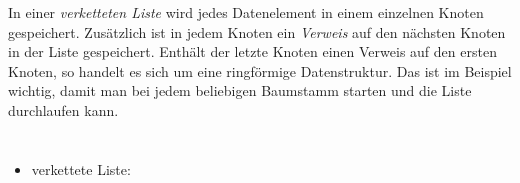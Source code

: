 {{In einer \emph{verketteten Liste} wird jedes Datenelement in einem einzelnen Knoten gespeichert. Zusätzlich ist in jedem Knoten ein \emph{Verweis} auf den nächsten Knoten in der Liste gespeichert. Enthält der letzte Knoten einen Verweis auf den ersten Knoten, so handelt es sich um eine ringförmige Datenstruktur. Das ist im Beispiel wichtig, damit man bei jedem beliebigen Baumstamm starten und die Liste durchlaufen kann.



\section*{\BrochureWebsitesAndKeywords}
{\raggedright
\begin{itemize}
  \item verkettete Liste: \href{https://de.wikipedia.org/wiki/Liste_(Datenstruktur)}{}
\end{itemize}


}

}{}

\def\AuthorDagieneV{} %
\def\AuthorKinciusV{} %
\def\AuthorPohlW{} %
\def\AuthorBaumannL{} %
\def\AuthorSchluterK{} %
\def\AuthorDatzkoThutS{} %

\newpage}{}
